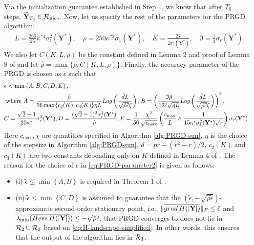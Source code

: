 \documentclass[11pt]{article}
\newcommand{\0}{{\mathbf{0}}}
\newcommand{\1}{{\mathbf{1}}}
\newcommand{\Y}{{\mathbf{Y}}}
\newcommand{\cR}{{\cal R}}
\newcommand{\Hess}{{\rm Hess}}
\newcommand{\grad}{{\rm grad}}
\newcommand{\F}{{\rm F}}
\renewcommand{\log}{{\rm Log}}
\begin{document}
{Via the initialization guarantee established in Step 1, we know that after $T_0$ steps, $\widetilde{\Y}_{T_0} \in \cR_{\text{nice}}$. Now, let us specify the rest of the parameters for the PRGD algorithm:
\begin{equation} \label{eq:PRGD-parameter1}
	\begin{split}
		& L = \frac{266}{25} \kappa^{*4} \sigma^2_1(\Y^*), \quad \rho = 250 \kappa^{*2} \sigma_1(\Y^*), \quad K = \frac{27}{2  \sigma_r^2(\Y^*)}, \quad \mathfrak{I} = \frac{1}{3} \sigma_r(\Y^*).
	\end{split}
\end{equation} We also let $C(K, L, \rho)$ be the constant defined in Lemma 2 and proof of Lemma 8 of \cite{sun2019escaping} and let $\hat{\rho} = \max\{ \rho, C(K, L, \rho)\}$. Finally, the accuracy parameter of the PRGD is chosen as $\tilde{\epsilon}$ such that
\begin{equation}\label{eq:PRGD-parameter2}
	\begin{split}
		& \tilde{\epsilon} < \min \left\{A, B, C, D, E  \right\},\\
		&\text{ where } A= \frac{\hat{\rho}}{56 \max\{c_2(K), c_3(K)\}\eta L} \log \left( \frac{\bar{d}L}{\sqrt{\hat{\rho}\tilde{\epsilon}}\zeta} \right), B = \left( \frac{\mathfrak{I}\hat{\rho}}{12\hat{c}\sqrt{\eta L}} \log \left( \frac{\bar{d}L}{\sqrt{\hat{\rho}\tilde{\epsilon}}\zeta} \right) \right)^2,\\
		& C = \frac{\sqrt{2} - 1}{20 \kappa^*} \sigma^3_r(\Y^*) , D = \frac{(\sqrt{2}-1)^2 \sigma_r^4(\Y^*)}{\hat{\rho}} , E = \frac{1}{50} \frac{\chi^2}{\sqrt{c_{\max}}} \left( \frac{c_{\max}}{L} \wedge \frac{1}{15 \kappa^* \sigma^2_1(\Y^*) \sqrt{r} }\right) \sigma_r(\Y^*).
	\end{split}
\end{equation} Here $c_{\max},\chi$ are quantities specified in Algorithm \ref{alg:PRGD-sun}, $\eta$ is the choice of the stepsize in Algorithm \ref{alg:PRGD-sun}, $\bar{d} = pr - (r^2-r)/2$, $c_2(K)$ and $c_3(K)$ are two constants depending only on $K$ defined in Lemma 4 of \cite{sun2019escaping}.
The reason for the choice of $\tilde{\epsilon}$ in \eqref{eq:PRGD-parameter2} is given as follows:
\begin{itemize}
	\item (i) $\tilde{\epsilon} \leq  \min \left\{A, B\right\}$ is required in Theorem 1 of \cite{sun2019escaping}.
	\item (ii) $\tilde{\epsilon} \leq  \min \left\{C, D \right\}$ is assumed to guarantee that the $(\tilde{\epsilon}, - \sqrt{\hat{\rho} \tilde{\epsilon} } )$-approximate second-order stationary point, i.e., $\|\overline{\grad\, H([\Y])} \|_\F \leq \tilde{\epsilon}$ and $\lambda_{\min}(\overline{ \Hess\, H([\Y])}) \leq - \sqrt{\hat{\rho} \tilde{\epsilon}}$, that PRGD converges to does not lie in $\cR_2 \cup \cR_3 $ based on \eqref{eq:H-landscape-simplified}. In other words, this ensures that the output of the algorithm lies in $\cR_1$.

\end{itemize}}
\end{document}
